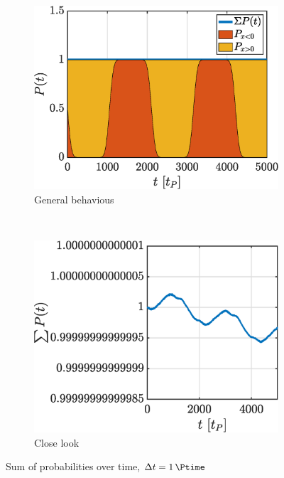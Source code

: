 \documentclass[a4paper,12pt,twoside]{article}
\begin{document}
    \begin{figure}[h]
      \begin{subfigure}[t]{0.45\textwidth}
        \centering
        \includegraphics[width=\textwidth]{graphs/i_ptotcool.eps}
        \caption{General behavious}
        \label{fig:i_ptot_cool}
      \end{subfigure}
      ~
      \begin{subfigure}[t]{0.45\textwidth}
        \centering
        \includegraphics[width=\textwidth]{graphs/i_ptot.eps}
        \caption{Close look}
        \label{fig:i_ptot_ugly}
      \end{subfigure}
      \caption{Sum of probabilities over time, $\Delta t = \SI{1}{\Ptime}$}
      \label{fig:i_ptot}
    \end{figure}
\end{document}
